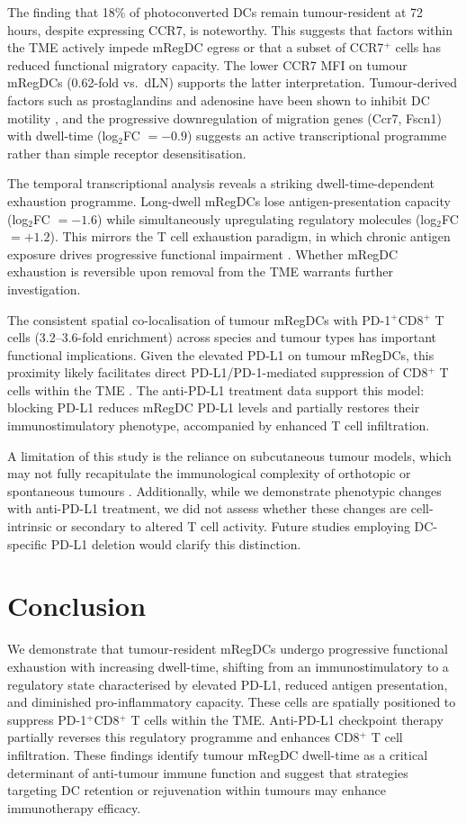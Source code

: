 \documentclass[11pt]{article}
\begin{document}
The finding that 18\% of photoconverted DCs remain tumour-resident at 72 hours, despite expressing CCR7, is noteworthy. This suggests that factors within the TME actively impede mRegDC egress or that a subset of CCR7$^{+}$ cells has reduced functional migratory capacity. The lower CCR7 MFI on tumour mRegDCs (0.62-fold vs.\ dLN) supports the latter interpretation. Tumour-derived factors such as prostaglandins and adenosine have been shown to inhibit DC motility \citep{dejong2019,silva2017}, and the progressive downregulation of migration genes (Ccr7, Fscn1) with dwell-time (log$_2$FC $= -0.9$) suggests an active transcriptional programme rather than simple receptor desensitisation.

The temporal transcriptional analysis reveals a striking dwell-time-dependent exhaustion programme. Long-dwell mRegDCs lose antigen-presentation capacity (log$_2$FC $= -1.6$) while simultaneously upregulating regulatory molecules (log$_2$FC $= +1.2$). This mirrors the T cell exhaustion paradigm, in which chronic antigen exposure drives progressive functional impairment \citep{wherry2015,mclane2019}. Whether mRegDC exhaustion is reversible upon removal from the TME warrants further investigation.

The consistent spatial co-localisation of tumour mRegDCs with PD-1$^{+}$CD8$^{+}$ T cells (3.2--3.6-fold enrichment) across species and tumour types has important functional implications. Given the elevated PD-L1 on tumour mRegDCs, this proximity likely facilitates direct PD-L1/PD-1-mediated suppression of CD8$^{+}$ T cells within the TME \citep{lin2020,peng2020}. The anti-PD-L1 treatment data support this model: blocking PD-L1 reduces mRegDC PD-L1 levels and partially restores their immunostimulatory phenotype, accompanied by enhanced T cell infiltration.

A limitation of this study is the reliance on subcutaneous tumour models, which may not fully recapitulate the immunological complexity of orthotopic or spontaneous tumours \citep{olson2018}. Additionally, while we demonstrate phenotypic changes with anti-PD-L1 treatment, we did not assess whether these changes are cell-intrinsic or secondary to altered T cell activity. Future studies employing DC-specific PD-L1 deletion would clarify this distinction.

\section{Conclusion}

We demonstrate that tumour-resident mRegDCs undergo progressive functional exhaustion with increasing dwell-time, shifting from an immunostimulatory to a regulatory state characterised by elevated PD-L1, reduced antigen presentation, and diminished pro-inflammatory capacity. These cells are spatially positioned to suppress PD-1$^{+}$CD8$^{+}$ T cells within the TME. Anti-PD-L1 checkpoint therapy partially reverses this regulatory programme and enhances CD8$^{+}$ T cell infiltration. These findings identify tumour mRegDC dwell-time as a critical determinant of anti-tumour immune function and suggest that strategies targeting DC retention or rejuvenation within tumours may enhance immunotherapy efficacy.



\end{document}
